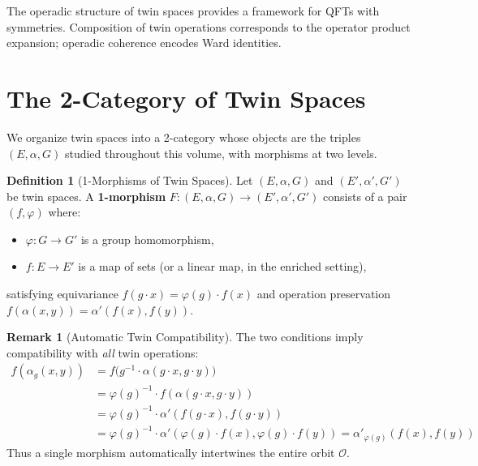 \documentclass[11pt,a4paper,openany]{book}
\theoremstyle{plain}
\theoremstyle{definition}
\newtheorem{definition}[theorem]{Definition}
\newtheorem{remark}[theorem]{Remark}
\newcommand{\opspace}{\mathcal{O}}
\newcommand{\actspace}{E}
\newcommand{\groupG}{G}
\begin{document}
\begin{applicationbox}
The operadic structure of twin spaces provides a framework for QFTs with symmetries. Composition of twin operations corresponds to the operator product expansion; operadic coherence encodes Ward identities.
\end{applicationbox}

\section{The 2-Category of Twin Spaces}

We organize twin spaces into a 2-category whose objects are the triples $(\actspace, \alpha, \groupG)$ studied throughout this volume, with morphisms at two levels.

\begin{definition}[1-Morphisms of Twin Spaces]\label{def:twin-1-morph}
Let $(\actspace, \alpha, \groupG)$ and $(\actspace', \alpha', \groupG')$ be twin spaces. A \textbf{1-morphism}
$F : (\actspace, \alpha, \groupG) \to (\actspace', \alpha', \groupG')$
consists of a pair $(f, \varphi)$ where:
\begin{itemize}
    \item $\varphi : \groupG \to \groupG'$ is a group homomorphism,
    \item $f : \actspace \to \actspace'$ is a map of sets (or a linear map, in the enriched setting),
\end{itemize}
satisfying equivariance $f(g \cdot x) = \varphi(g) \cdot f(x)$ and operation preservation $f(\alpha(x, y)) = \alpha'(f(x), f(y))$.
\end{definition}

\begin{remark}[Automatic Twin Compatibility]
The two conditions imply compatibility with \emph{all} twin operations:
\begin{align*}
f(\alpha_g(x, y)) &= f\big(g^{-1} \cdot \alpha(g \cdot x, g \cdot y)\big) \\
&= \varphi(g)^{-1} \cdot f(\alpha(g \cdot x, g \cdot y)) \\
&= \varphi(g)^{-1} \cdot \alpha'(f(g \cdot x), f(g \cdot y)) \\
&= \varphi(g)^{-1} \cdot \alpha'(\varphi(g) \cdot f(x), \varphi(g) \cdot f(y)) = \alpha'_{\varphi(g)}(f(x), f(y))
\end{align*}
Thus a single morphism automatically intertwines the entire orbit $\opspace$.
\end{remark}
\end{document}
